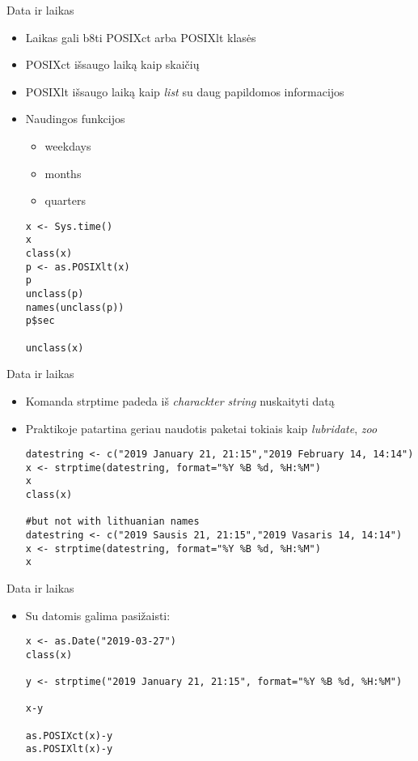\documentclass[11pt,xcolor=table]{beamer}
\begin{document}

\begin{frame}[fragile]{Data ir laikas}
\begin{itemize}
\item Laikas gali b8ti POSIXct arba POSIXlt klasės
\item POSIXct išsaugo laiką kaip skaičių
\item POSIXlt išsaugo laiką kaip \textit{list} su daug papildomos informacijos
\item Naudingos funkcijos
\begin{itemize}
\item weekdays
\item months
\item quarters
\end{itemize}
\begin{lstlisting}
x <- Sys.time()
x
class(x)
p <- as.POSIXlt(x)
p
unclass(p)
names(unclass(p))
p$sec

unclass(x)

\end{lstlisting}
\end{itemize}
\end{frame}


\begin{frame}[fragile]{Data ir laikas}
\begin{itemize}
\item Komanda strptime padeda iš \textit{charackter string} nuskaityti datą
\item Praktikoje patartina geriau naudotis paketai tokiais kaip \textit{lubridate}, \textit{zoo}
\begin{lstlisting}
datestring <- c("2019 January 21, 21:15","2019 February 14, 14:14")
x <- strptime(datestring, format="%Y %B %d, %H:%M")
x
class(x)

#but not with lithuanian names
datestring <- c("2019 Sausis 21, 21:15","2019 Vasaris 14, 14:14")
x <- strptime(datestring, format="%Y %B %d, %H:%M")
x
\end{lstlisting}
\end{itemize}
\end{frame}


\begin{frame}[fragile]{Data ir laikas}
\begin{itemize}
\item Su datomis galima pasižaisti:
\begin{lstlisting}
x <- as.Date("2019-03-27")
class(x)

y <- strptime("2019 January 21, 21:15", format="%Y %B %d, %H:%M")

x-y

as.POSIXct(x)-y
as.POSIXlt(x)-y

\end{lstlisting}
\end{itemize}
\end{frame}
\end{document}
